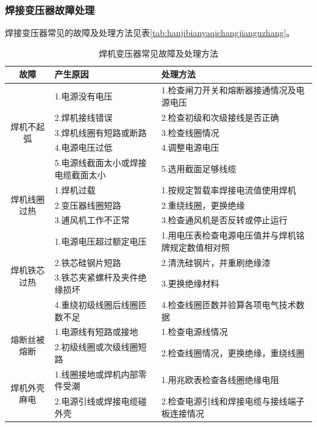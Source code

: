 \documentclass{ctexbook}
\begin{document}
\subsubsection{焊接变压器故障处理}
焊接变压器常见的故障及处理方法见表\ref{tab:hanjibianyaqichangjianguzhang}。
\begin{table}[htbp]
	\centering
	\caption{焊机变压器常见故障及处理方法}
	\begin{tabular}{c|l|l}
		\toprule
		故障    & 产生原因  & 处理方法 \\
		\midrule
		\multirow{5}[10]{*}{焊机不起弧} & 1.电源没有电压  & 1.检查闸刀开关和熔断器接通情况及电源电压 \\
		\cmidrule{2-3}          & 2.焊机接线错误 & 2.检查初级和次级接线是否正确 \\
		\cmidrule{2-3}          & 3.焊机线圈有短路或断路  & 3.检查线圈情况  \\
		\cmidrule{2-3}          & 4.电源电压过低 & 4.调整电源电压 \\
		\cmidrule{2-3}          & 5.电源线截面太小或焊接电缆截面太小 & 5.选用截面足够线缆 \\
		\midrule
		\multirow{3}[6]{*}{焊机线圈过热} & 1.焊机过载 & 1.按规定暂载率焊接电流值使用焊机 \\
		\cmidrule{2-3}          & 2.变压器线圈短路 & 2.重绕线圈，更换绝缘 \\
		\cmidrule{2-3}          & 3.逋风机工作不正常 & 3.检查通风机是否反转或停止运行 \\
		\midrule
		\multirow{4}[8]{*}{焊机铁芯过热} & 1.电源电压超过额定电压 & 1.用电压表检查电源电压值并与焊机铭牌规定数值相对照 \\
		\cmidrule{2-3}          & 2.铁芯硅钢片短路 & 2.清洗硅钢片，并重刷绝缘漆 \\
		\cmidrule{2-3}          & 3.铁芯夹紧螺杆及夹件绝缘损坏 & 3.更换绝缘材料 \\
		\cmidrule{2-3}          & 4.重绕初级线圈后线圈匝数不足 & 4.检查线圈匝数并验算各项电气技术数据 \\
		\midrule
		\multirow{2}[4]{*}{熔断丝被熔断} & 1.电源线有短路或接地  & 1.检查电源线情况  \\
		\cmidrule{2-3}          & 2.初级线圈或次级线圈短路 & 2.检查线圈情况，更换绝缘，重绕线圈 \\
		\midrule
		\multirow{2}[4]{*}{焊机外壳麻电} & 1.线圈接地或焊机内部零件受潮  & 1.用兆欧表检查各线圈绝缘电阻  \\
		\cmidrule{2-3}          & 2.电源引线或焊接电缆碰外壳 & 2.检查电源引线和焊接电缆与接线端子板连接情况 \\

\end{tabular}
\end{table}
\end{document}
